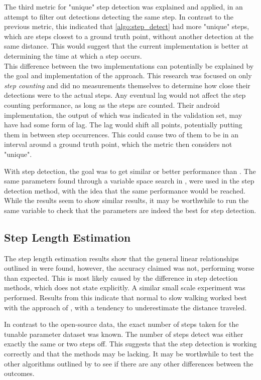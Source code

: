 The third metric for "unique" step detection was explained and applied, in an attempt to filter out detections detecting the same step. In contrast to the previous metric, this indicated that \cref{algo:step_detect} had more "unique" steps, which are steps closest to a ground truth point, without another detection at the same distance. This would suggest that the current implementation is better at determining the time at which a step occurs. \\
This difference between the two implementations can potentially be explained by the goal and implementation of the \citet{Salvi2018} approach. This research was focused on only \textit{step counting} and did no measurements themselves to determine how close their detections were to the actual steps. Any eventual lag would not affect the step counting performance, as long as the steps are counted. Their android implementation, the output of which was indicated in the validation set, may have had some form of lag. The lag would shift all points, potentially putting them in between step occurrences. This could cause two of them to be in an interval around a ground truth point, which the metric then considers not "unique". \par 

With step detection, the goal was to get similar or better performance than \cite{Salvi2018} . The same parameters found through a variable space search in \cite{Salvi2018}, were used in the step detection method, with the idea that the same performance would be reached. While the results seem to show similar results, it may be worthwhile to run the same variable to check that the parameters are indeed the best for step detection.

\subsection*{Step Length Estimation}
The step length estimation results show that the general linear relationships outlined in \cite{Vezocnik2019} were found, however, the accuracy claimed was not, performing worse than expected. This is most likely caused by the difference in step detection methods, which \cite{Vezocnik2019} does not state explicitly. A similar small scale experiment was performed. Results from this indicate that normal to slow walking worked best with the approach of \citet{Tian2016}, with a tendency to underestimate the distance traveled. \par 

In contrast to the open-source data, the exact number of steps taken for the tunable parameter dataset was known. The number of steps detect was either exactly the same or two steps off. This suggests that the step detection is working correctly and that the methods may be lacking. It may be worthwhile to test the other algorithms outlined by \cite{Vezocnik2019} to see if there are any other differences between the outcomes. 

